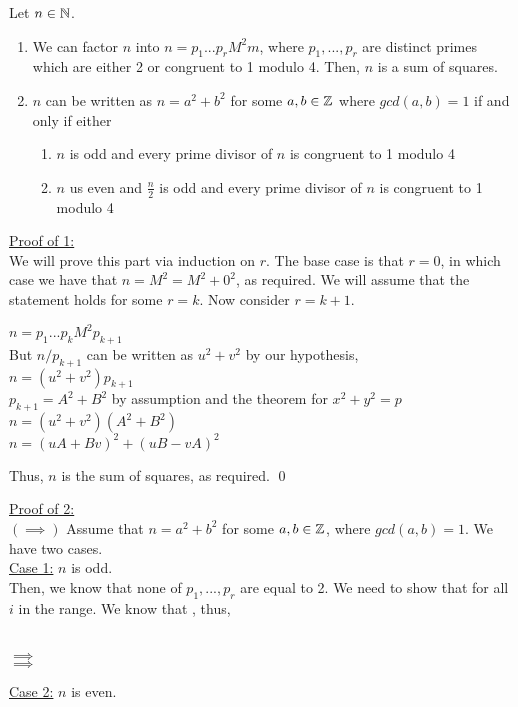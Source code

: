 \documentclass[../main.tex]{subfiles}
\begin{document}
\begin{thm}
    Let $n \in \mathbb{N}$. 
    \begin{enumerate}
        \item We can factor $n$ into $n=p_1...p_rM^2m$, where $p_1,...,p_r$ are distinct primes which are either 2 or congruent to 1 modulo 4. Then, $n$ is a sum of squares.
        \item $n$ can be written as $n=a^2+b^2$ for some $a,b \in \mathbb{Z}$ where $gcd(a,b)=1$ if and only if either
        \begin{enumerate}
             \item $n$ is odd and every prime divisor of $n$ is congruent to 1 modulo 4
             \item $n$ us even and $\tfrac{n}{2}$ is odd and every prime divisor of $n$ is congruent to 1 modulo 4
        \end{enumerate}
    \end{enumerate}
\end{thm}
\begin{pf}
    \underline{Proof of 1:} \\
    We will prove this part via induction on $r$. The base case is that $r=0$, in which case we have that $n=M^2=M^2+0^2$, as required. We will assume that the statement holds for some $r=k$. Now consider $r=k+1$.
    \begin{center}
        $n=p_1...p_kM^2p_{k+1}$ \\
        But $n/p_{k+1}$ can be written as $u^2+v^2$ by our hypothesis, \\
        $n=(u^2+v^2)p_{k+1}$ \\
        $p_{k+1}=A^2+B^2$ by assumption and the theorem for $x^2+y^2=p$ \\
        $n=(u^2+v^2)(A^2+B^2)$ \\
        $n=(uA+Bv)^2+(uB-vA)^2$
    \end{center}
    Thus, $n$ is the sum of squares, as required. \qed
\end{pf}
\begin{pf}[Cont.]
    \underline{Proof of 2:} \\
    $(\implies)$ Assume that $n=a^2+b^2$ for some $a,b \in \mathbb{Z}$, where $gcd(a,b)=1$. We have two cases. \\
    \underline{Case 1:} $n$ is odd. \\
    Then, we know that none of $p_1,...,p_r$ are equal to 2. We need to show that  for all $i$ in the range. We know that , thus,
    \begin{center}
         \\
        $\implies$  \\
        $\implies$ 
    \end{center}
    \underline{Case 2:} $n$ is even.
    
\end{pf}
\end{document}

